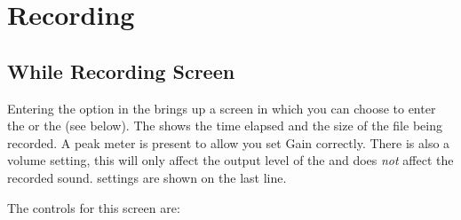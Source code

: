 \section{\label{ref:Recording}Recording}
\subsection{\label{ref:while_recording_screen}While Recording Screen}

Entering the  option in the  brings up
a screen in which you can choose to enter the  or
the  (see below). The 
shows the time elapsed and the size of the file being recorded. A peak meter
is present to allow you set Gain correctly. There is also a volume setting,
this will only affect the output level of the \dap{} and does \emph{not}
affect the recorded sound.
 settings are shown on the last line.

The controls for this screen are:

